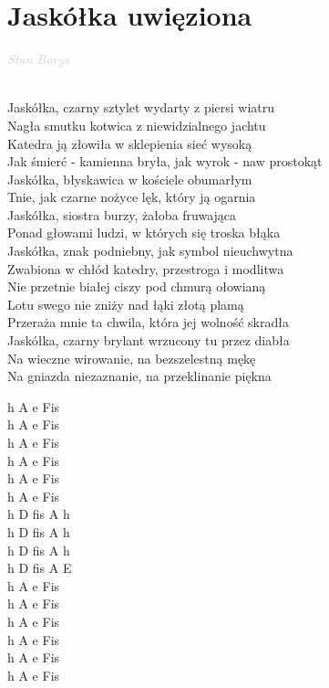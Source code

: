 \documentclass[a5paper, 10pt]{book}
\begin{document}
\section{Jaskółka uwięziona}\textcolor{lightgray}{\textit{Stan Borys}}\\~\\
\begin{minipage}[t]{0.8\textwidth}
Jaskółka, czarny sztylet wydarty z piersi wiatru\\
Nagła smutku kotwica z niewidzialnego jachtu\\
Katedra ją złowiła w sklepienia sieć wysoką\\
Jak śmierć - kamienna bryła, jak wyrok - naw prostokąt\\
Jaskółka, błyskawica w kościele obumarłym\\
Tnie, jak czarne nożyce lęk, który ją ogarnia\\

\hspace*{5mm}Jaskółka, siostra burzy, żałoba fruwająca\\
\hspace*{5mm}Ponad głowami ludzi, w których się troska błąka\\
\hspace*{5mm}Jaskółka, znak podniebny, jak symbol nieuchwytna\\
\hspace*{5mm}Zwabiona w chłód katedry, przestroga i modlitwa\\

Nie przetnie białej ciszy pod chmurą ołowianą\\
Lotu swego nie zniży nad łąki złotą plamą\\
Przeraża mnie ta chwila, która jej wolność skradła\\
Jaskółka, czarny brylant wrzucony tu przez diabła\\

Na wieczne wirowanie, na bezszelestną mękę\\
Na gniazda niezaznanie, na przeklinanie piękna\\
\end{minipage}
\begin{minipage}[t]{0.2\textwidth}
h A e Fis\\h A e Fis\\h A e Fis\\h A e Fis\\h A e Fis\\h A e Fis\\

h D fis A h\\
h D fis A h\\
h D fis A h\\
h D fis A E\\

h A e Fis\\h A e Fis\\h A e Fis\\h A e Fis\\

h A e Fis\\h A e Fis\\
\end{minipage}
\end{document}
